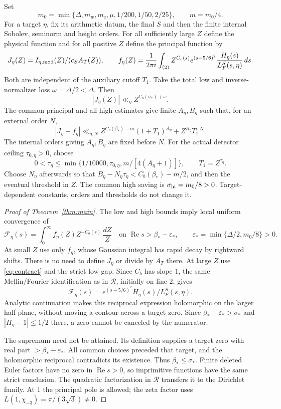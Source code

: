 \documentclass[11pt,a4paper]{article}
\theoremstyle{definition}
\newcommand{\Rea}{\operatorname{Re}}
\newcommand{\eps}{\varepsilon}
\newcommand{\bet}{\beta_*}
\newcommand{\sig}{\sigma_*}
\begin{document}
Set
\[
 m_0=\min\{\Delta,m_w,m_z,\mu,1/200,1/50,2/25\},\qquad m=m_0/4 .
\]
For a target $\eta$, fix its arithmetic datum, the final $S$
and then the finite internal Sobolev, seminorm and height orders.
For all sufficiently large $Z$ define the physical function
and for all positive $Z$ define the principal function by
\[
 J_\eta(Z)=I_{\eta,\rm mod}(Z)/(c_SA_T(Z)),\qquad
 f_\eta(Z)=\frac1{2\pi i}\int_{(2)}
 Z^{C_b(s)}e^{(s-5/6)^2}
             \frac{H_\eta(s)}{L_F^S(s,\eta)}\,ds .
\]
Both are independent of the auxiliary cutoff $T_1$.
Take the total low and inverse-normalizer loss
$\omega=\Delta/2<\Delta$. Then
\[
 |J_\eta(Z)|\ll_\eta Z^{C_b(\sig)+\omega}.
\]
The common principal and all high estimates give finite
$A_\eta,B_\eta$ such that, for an external order $N$,
\begin{equation}\label{eq:contract}
 |J_\eta-f_\eta|\ll_{\eta,N}
 Z^{C_b(\bet)-m}(1+T_1)^{A_\eta}+Z^{B_\eta}T_1^{-N}.
\end{equation}
The internal orders giving $A_\eta,B_\eta$ are fixed before $N$.
For the actual detector ceiling $\tau_{0,\eta}>0$, choose
\[
 0<\tau_\eta\le
 \min\{1/10000,\tau_{0,\eta},m/[4(A_\eta+1)]\},\qquad
 T_1=Z^{\tau_\eta}.
\]
Choose $N_\eta$ afterwards so that
$B_\eta-N_\eta\tau_\eta<C_b(\bet)-m/2$,
and then the eventual threshold in $Z$.
The common high saving is $\sigma_{\rm hi}=m_0/8>0$.
Target-dependent constants, orders and thresholds do not change it.

\begin{proof}[Proof of Theorem~\ref{thm:main}]
The low and high bounds imply
local uniform convergence of
\[
 \mathcal F_\eta(s)=
 \int_0^\infty f_\eta(Z)Z^{-C_b(s)}\,\frac{dZ}{Z}
 \quad\text{on }\Rea s>\bet-\eps_*,
 \qquad \eps_*=\min\{\Delta/2,m_0/8\}>0 .
\]
At small $Z$ use only $f_\eta$, whose Gaussian integral has
rapid decay by rightward shifts. There is no need to define
$J_\eta$ or divide by $A_T$ there. At large $Z$ use
\eqref{eq:contract} and the strict low gap.
Since $C_b$ has slope $1$, the same Mellin/Fourier identification
as in $\mathcal R$, initially on line $2$, gives
\[
 \mathcal F_\eta(s)=e^{(s-5/6)^2}
                    H_\eta(s)/L_F^S(s,\eta).
\]
Analytic continuation makes this reciprocal expression holomorphic
on the larger half-plane, without moving a contour across a
target zero. Since $\bet-\eps_*>\sig$ and $|H_\eta-1|\le1/2$
there, a zero cannot be canceled by the numerator.

The supremum need not be attained. Its definition supplies a
target zero with real part $>\bet-\eps_*$.
All common choices preceded that target, and the holomorphic
reciprocal contradicts its existence. Thus $\bet\le\sig$.
Finite deleted Euler factors have no zero in $\Rea s>0$,
so imprimitive functions have the same strict conclusion.
The quadratic factorization in $\mathcal R$ transfers it
to the Dirichlet family. At $1$ the principal pole is allowed;
the zeta factor uses $L(1,\chi_{-3})=\pi/(3\sqrt3)\ne0$.
\end{proof}
\end{document}
